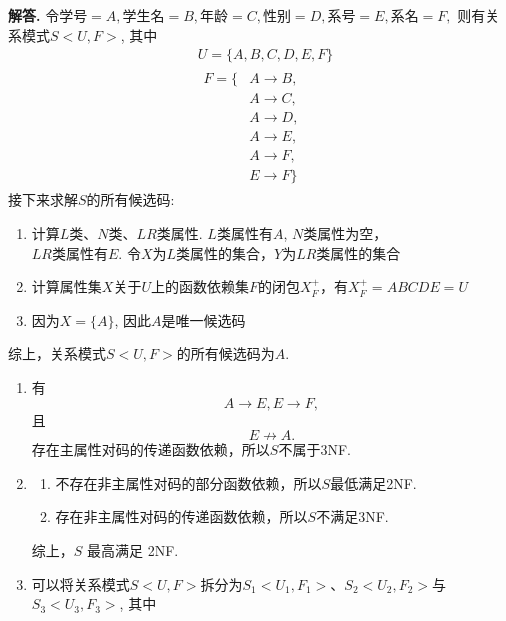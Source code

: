 \documentclass[12pt, a4paper, oneside]{ctexart}
\newenvironment{solution}{\par\noindent\textbf{解答. }}{\par}
\begin{document}
\begin{solution}
    令$\text{学号} = A, \text{学生名} = B, \text{年龄} = C, \text{性别} = D, \text{系号} = E, \text{系名} = F,$
    则有关系模式$S<U,F>$, 其中
    $$
        \begin{aligned}
            & U = \{A, B, C, D, E, F\} \\
            & \begin{aligned}
                F = \{ &A\rightarrow B, \\
                & A\rightarrow C, \\
                & A\rightarrow D, \\
                & A\rightarrow E, \\
                & A\rightarrow F, \\
                & E\rightarrow F\}
              \end{aligned}
        \end{aligned}
    $$
    接下来求解$S$的所有候选码:
    \begin{enumerate}[$1^\circ$]
        \item 计算$L$类、$N$类、$LR$类属性. $L$类属性有$A$, $N$类属性为空，\\
        $LR$类属性有$E$. 令$X$为$L$类属性的集合，$Y$为$LR$类属性的集合
        \item 计算属性集$X$关于$U$上的函数依赖集$F$的闭包$X_F^+$，有$X_F^+ = ABCDE = U$
        \item 因为$X = \{ A \}$, 因此$A$是唯一候选码
    \end{enumerate}
    综上，关系模式$S<U, F>$的所有候选码为$A$.
    \begin{enumerate}[(1)]
        \item 
            有$$A\rightarrow E, E\rightarrow F,$$
            且$$E\not\rightarrow A.$$
            存在主属性对码的传递函数依赖，所以$S$不属于3NF.
        \item 
            \begin{enumerate}[$1^\circ$]
                \item 不存在非主属性对码的部分函数依赖，所以$S$最低满足2NF.
                \item 存在非主属性对码的传递函数依赖，所以$S$不满足3NF.
            \end{enumerate}
            综上，$S$ 最高满足 2NF.
        \item 
            可以将关系模式$S<U, F>$拆分为$S_1<U_1, F_1>$、$S_2<U_2, F_2>$与$S_3<U_3, F_3>$, 其中
            $$
                \begin{aligned}

\end{aligned}$$
\end{enumerate}
\end{solution}
\end{document}
